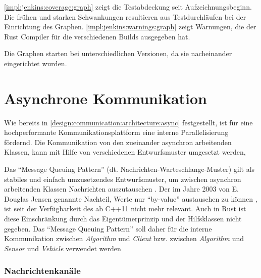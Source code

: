\autoref{impl:jenkins:coverage:graph} zeigt die Testabdeckung seit Aufzeichnungsbeginn.
Die frühen und starken Schwankungen resultieren aus Testdurchläufen bei der Einrichtung des Graphen.
\autoref{impl:jenkins:warnings:graph} zeigt Warnungen, die der Rust Compiler für die verschiedenen Builds ausgegeben hat.

Die Graphen starten bei unterschiedlichen Versionen, da sie nacheinander eingerichtet wurden.

\clearpage
\section{Asynchrone Kommunikation}
\label{impl:channels}

Wie bereits in \autoref{design:communication:architecture:async} festgestellt, ist für eine hochperformante Kommunikationsplattform eine interne Parallelisierung fördernd.
Die Kommunikation von den zueinander asynchron arbeitenden Klassen, kann mit Hilfe von verschiedenen Entwurfsmuster umgesetzt werden,

Das \enquote{Message Queuing Pattern} (dt. Nachrichten-Warteschlange-Muster) gilt als stabiles und einfach umzusetzendes Entwurfsmuster, um zwischen asynchron arbeitenden Klassen Nachrichten auszutauschen \cite[207]{douglass2003real}.
Der im Jahre 2003 von E. Douglas Jensen genannte Nachteil, Werte nur \enquote{by-value} austauschen zu können \cite[211]{douglass2003real}, ist seit der Verfügbarkeit des  ab C++11 nicht mehr relevant.
Auch in Rust ist diese Einschränkung durch das Eigentümerprinzip und der Hilfsklassen   nicht gegeben.
Das \enquote{Message Queuing Pattern} soll daher für die interne Kommunikation zwischen \textit{Algorithm} und \textit{Client} bzw. zwischen \textit{Algorithm} und \textit{Sensor} und \textit{Vehicle} verwendet werden

\subsubsection{Nachrichtenkanäle}

